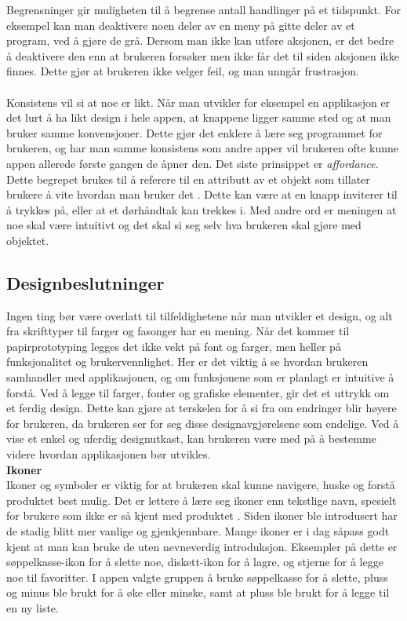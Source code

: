 Begrensninger gir muligheten til å begrense antall handlinger på et tidspunkt. For eksempel kan man deaktivere noen deler av en meny på gitte deler av et program, ved å gjøre de grå. Dersom man ikke kan utføre aksjonen, er det bedre å deaktivere den enn at brukeren forsøker men ikke får det til siden aksjonen ikke finnes. Dette gjør at brukeren ikke velger feil, og man unngår frustrasjon.
\\\\
Konsistens vil si at noe er likt. Når man utvikler for eksempel en applikasjon er det lurt å ha likt design i hele appen, at knappene ligger samme sted og at man bruker samme konvensjoner. Dette gjør det enklere å lære seg programmet for brukeren, og har man samme konsistens som andre apper vil brukeren ofte kunne appen allerede første gangen de åpner den. 
Det siste prinsippet er \textit{affordance}. Dette begrepet brukes til å referere til en attributt av et objekt som tillater brukere å vite hvordan man bruker det \cite[p.~29]{preece}. Dette kan være at en knapp inviterer til å trykkes på, eller at et dørhåndtak kan trekkes i. Med andre ord er meningen at noe skal være intuitivt og det skal si seg selv hva brukeren skal gjøre med objektet.


\subsection{Designbeslutninger}
Ingen ting bør være overlatt til tilfeldighetene når man utvikler et design, og alt fra skrifttyper til farger og fasonger har en mening. Når det kommer til papirprototyping legges det ikke vekt på font og farger, men heller på funksjonalitet og brukervennlighet. Her er det viktig å se hvordan brukeren samhandler med applikasjonen, og om funksjonene som er planlagt er intuitive å forstå. Ved å legge til farger, fonter og grafiske elementer, gir det et uttrykk om et ferdig design. Dette kan gjøre at terskelen for å si fra om endringer blir høyere for brukeren, da brukeren ser for seg disse designavgjørelsene som endelige. Ved å vise et enkel og uferdig designutkast, kan brukeren være med på å bestemme videre hvordan applikasjonen bør utvikles.\\

\noindent\textbf{Ikoner}\\
Ikoner og symboler er viktig for at brukeren skal kunne navigere, huske og forstå produktet best mulig. Det er lettere å lære seg ikoner enn tekstlige navn, spesielt for brukere som ikke er så kjent med produktet \cite[p.~171]{preece}. Siden ikoner ble introdusert har de stadig blitt mer vanlige og gjenkjennbare. Mange ikoner er i dag såpass godt kjent at man kan bruke de uten nevneverdig introduksjon. Eksempler på dette er søppelkasse-ikon for å slette noe, diskett-ikon for å lagre, og stjerne for å legge noe til favoritter. I appen valgte gruppen å bruke søppelkasse for å slette, pluss og minus ble brukt for å øke eller minske, samt at pluss ble brukt for å legge til en ny liste.\\

